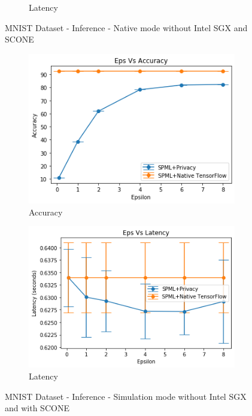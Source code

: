 \begin{figure}
\begin{subfigure}{0.5\textwidth}
         \caption{Latency}
         \label{fig:nativeMnistLatencyInference}
     \end{subfigure}
        \caption{MNIST Dataset - Inference - Native mode without Intel SGX and SCONE}
     \begin{subfigure}{0.5\textwidth}
         \includegraphics[width=\textwidth]{images/Inference/MnistSimAccuracyInference.png}
         \caption{Accuracy}
         \label{fig:simMnistAccuracyInference}
     \end{subfigure}
     \begin{subfigure}{0.5\textwidth}
         \includegraphics[width=\textwidth]{images/Inference/MnistSimLatencyInference.png}
         \caption{Latency}
         \label{fig:simMnistLatencyInference}
     \end{subfigure}
        \caption{MNIST Dataset - Inference - Simulation mode without Intel SGX and with SCONE}

\end{figure}
